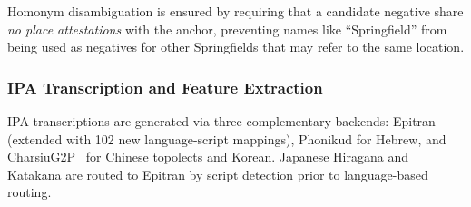 \documentclass[11pt,a4paper]{article}
\begin{document}
Homonym disambiguation is ensured by requiring that a candidate negative share \emph{no place attestations} with the anchor, preventing names like ``Springfield'' from being used as negatives for other Springfields that may refer to the same location.

\subsubsection{IPA Transcription and Feature Extraction}
\label{subsec:g2p}

IPA transcriptions are generated via three complementary backends: Epitran~\citep{mortensen2018} (extended with 102 new language-script mappings), Phonikud for Hebrew, and CharsiuG2P~\citep{zhu2022charsiu-g2p} for Chinese topolects and Korean. Japanese Hiragana and Katakana are routed to Epitran by script detection prior to language-based routing.
\end{document}
